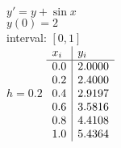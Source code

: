 {
$y' = y + \sin x$\\
$y(0)=2$\\
interval: $[0,1]$\\
$h = 0.2$
}
{
	$\begin{array}{l | l}
		x_i & y_i    \\ \hline
		0.0 & 2.0000 \\
		0.2 & 2.4000 \\
		0.4 & 2.9197 \\
		0.6 & 3.5816 \\
		0.8 & 4.4108 \\
		1.0 & 5.4364
	\end{array}$
}